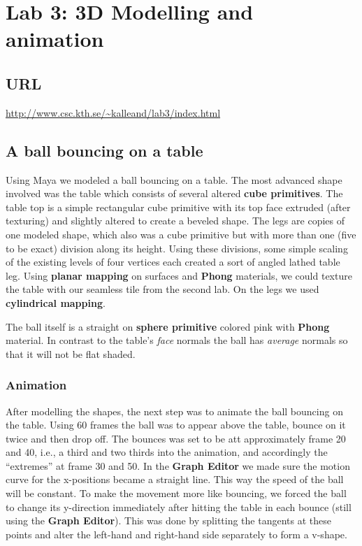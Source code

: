 \documentclass[a4paper]{article}
\begin{document}
\section{Lab 3: 3D Modelling and animation}

\subsection*{URL}
\url{http://www.csc.kth.se/~kalleand/lab3/index.html}

\subsection{A ball bouncing on a table} %
Using Maya we modeled a ball bouncing on a table. The most advanced shape
involved was the table  which consists of several altered \textbf{cube
primitives}. The table top is a simple rectangular cube primitive with its top
face extruded (after texturing) and slightly altered to create a beveled shape.
The legs are copies of one modeled shape, which also was a cube primitive but
with more than one (five to be exact) division along its height. Using these
divisions, some simple scaling of the existing levels of four vertices each
created a sort of angled lathed table leg. Using \textbf{planar mapping} on
surfaces and \textbf{Phong} materials, we could texture the table with our
seamless tile from the second lab. On the legs we used \textbf{cylindrical
mapping}.

The ball itself is a straight on \textbf{sphere primitive} colored pink with
\textbf{Phong} material. In contrast to the table's \textit{face} normals the
ball has \textit{average} normals so that it will not be flat shaded. 

\subsubsection{Animation}
After modelling the shapes, the next step was to animate the ball bouncing on
the table. Using 60 frames the ball was to appear above the table, bounce on it
twice and then drop off. The bounces was set to be att approximately frame 20
and 40, i.e., a third and two thirds into the animation, and accordingly the
``extremes'' at frame 30 and 50. In the \textbf{Graph Editor} we made sure the
motion curve for the x-positions became a straight line. This way the speed of
the ball will be constant. To make the movement more like bouncing, we forced
the ball to change its y-direction immediately after hitting the table in each
bounce (still using the \textbf{Graph Editor}). This was done by splitting the
tangents at these points and alter the left-hand and right-hand side separately
to form a v-shape. 
\end{document}
